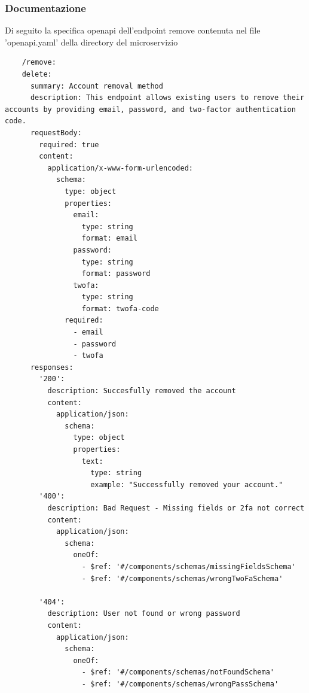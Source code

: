 \documentclass{report}
\begin{document}
\subsubsection*{Documentazione}
Di seguito la specifica openapi dell'endpoint remove contenuta nel file 'openapi.yaml' della directory del microservizio

\begin{verbatim}
	/remove:
    delete:
      summary: Account removal method
      description: This endpoint allows existing users to remove their accounts by providing email, password, and two-factor authentication code.
      requestBody:
        required: true
        content:
          application/x-www-form-urlencoded:
            schema:
              type: object
              properties:
                email:
                  type: string
                  format: email
                password:
                  type: string
                  format: password
                twofa:
                  type: string
                  format: twofa-code
              required:
                - email
                - password
                - twofa
      responses:
        '200':
          description: Succesfully removed the account
          content:
            application/json:
              schema:
                type: object
                properties:
                  text:
                    type: string
                    example: "Successfully removed your account."
        '400':
          description: Bad Request - Missing fields or 2fa not correct
          content:
            application/json:
              schema:
                oneOf:
                  - $ref: '#/components/schemas/missingFieldsSchema'
                  - $ref: '#/components/schemas/wrongTwoFaSchema'
      
        '404':
          description: User not found or wrong password
          content:
            application/json:
              schema:
                oneOf:
                  - $ref: '#/components/schemas/notFoundSchema'
                  - $ref: '#/components/schemas/wrongPassSchema'

\end{verbatim}
\end{document}
